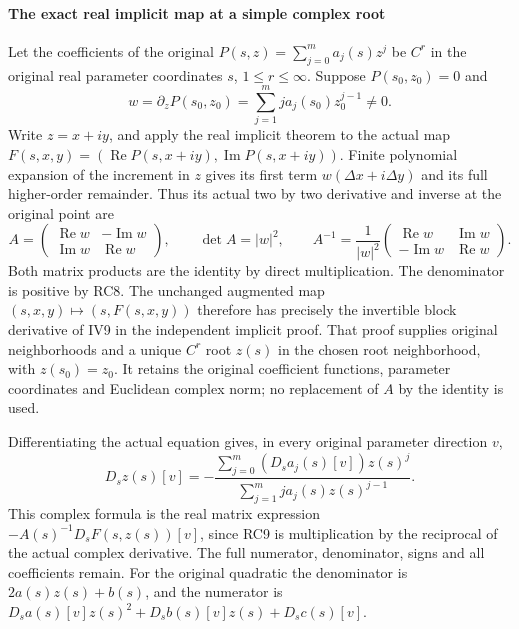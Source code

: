 \documentclass[
  11pt,
]{article}
\begin{document}
\paragraph{The exact real implicit map at a simple complex
root}\label{the-exact-real-implicit-map-at-a-simple-complex-root}

Let the coefficients of the original \(P(s,z)=\sum_{j=0}^m a_j(s)z^j\)
be \(C^r\) in the original real parameter coordinates \(s\),
\(1\leq r\leq\infty\). Suppose \(P(s_0,z_0)=0\) and \[
 w=\partial_zP(s_0,z_0)
    =\sum_{j=1}^m j a_j(s_0)z_0^{j-1}\ne0.
 \tag{RC8}
\] Write \(z=x+iy\), and apply the real implicit theorem to the actual
map
\(F(s,x,y)=(\operatorname{Re}P(s,x+iy),\operatorname{Im}P(s,x+iy))\).
Finite polynomial expansion of the increment in \(z\) gives its first
term \(w(\Delta x+i\Delta y)\) and its full higher-order remainder. Thus
its actual two by two derivative and inverse at the original point are
\[
 A=\begin{pmatrix}\operatorname{Re}w&-\operatorname{Im}w\\
                   \operatorname{Im}w&\operatorname{Re}w\end{pmatrix},
 \qquad \det A=|w|^2,\qquad
 A^{-1}=\frac1{|w|^2}
       \begin{pmatrix}\operatorname{Re}w&\operatorname{Im}w\\
                       -\operatorname{Im}w&\operatorname{Re}w\end{pmatrix}.
 \tag{RC9}
\] Both matrix products are the identity by direct multiplication. The
denominator is positive by RC8. The unchanged augmented map
\((s,x,y)\mapsto(s,F(s,x,y))\) therefore has precisely the invertible
block derivative of IV9 in the independent implicit proof. That proof
supplies original neighborhoods and a unique \(C^r\) root \(z(s)\) in
the chosen root neighborhood, with \(z(s_0)=z_0\). It retains the
original coefficient functions, parameter coordinates and Euclidean
complex norm; no replacement of \(A\) by the identity is used.

Differentiating the actual equation gives, in every original parameter
direction \(v\), \[
 D_sz(s)[v]=-
    \frac{\displaystyle\sum_{j=0}^m(D_sa_j(s)[v])z(s)^j}
         {\displaystyle\sum_{j=1}^m j a_j(s)z(s)^{j-1}}.
 \tag{RC10}
\] This complex formula is the real matrix expression
\(-A(s)^{-1}D_sF(s,z(s))[v]\), since RC9 is multiplication by the
reciprocal of the actual complex derivative. The full numerator,
denominator, signs and all coefficients remain. For the original
quadratic the denominator is \(2a(s)z(s)+b(s)\), and the numerator is
\(D_sa(s)[v]z(s)^2+D_sb(s)[v]z(s)+D_sc(s)[v]\).
\end{document}
